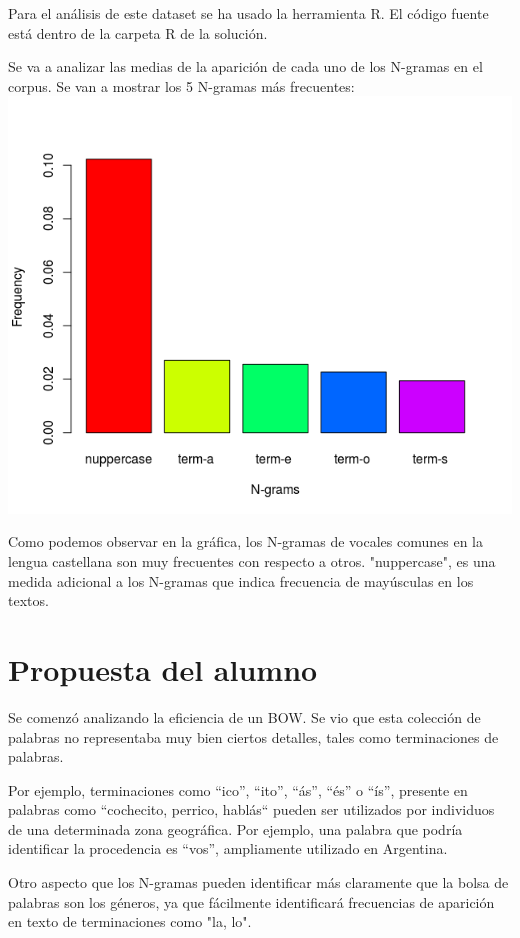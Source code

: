 \documentclass[11pt,a4paper]{article}
\begin{document}
Para el análisis de este dataset se ha usado la herramienta R. El código fuente está dentro de la carpeta R de la solución.

Se va a analizar las medias de la aparición de cada uno de los N-gramas en el corpus. Se van a mostrar los 5 N-gramas más frecuentes:
\includegraphics[scale=0.5]{barrasMeans}

Como podemos observar en la gráfica, los N-gramas de vocales comunes en la lengua castellana son muy frecuentes con respecto a otros. "nuppercase",  es una medida adicional a los N-gramas que indica frecuencia de mayúsculas en los textos.


\section{Propuesta del alumno}

Se comenzó analizando la eficiencia de un BOW. Se vio que esta colección de palabras no representaba muy bien ciertos detalles, tales como terminaciones de palabras. 

Por ejemplo, terminaciones como ``ico'', ``ito'', ``ás'', ``és'' o ``ís'', presente en palabras como ``cochecito, perrico, hablás`` pueden ser utilizados por individuos de una determinada zona geográfica. Por ejemplo, una palabra que podría identificar la procedencia es ``vos'', ampliamente utilizado en Argentina.

Otro aspecto que los N-gramas pueden identificar más claramente que la bolsa de palabras son los géneros, ya que fácilmente identificará frecuencias de aparición en texto de terminaciones como "la, lo".
\end{document}
